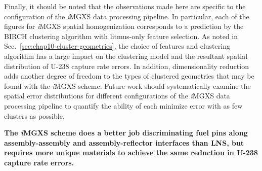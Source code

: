 Finally, it should be noted that the observations made here are specific to the configuration of the \textit{i}\ac{MGXS} data processing pipeline. In particular, each of the figures for \textit{i}\ac{MGXS} spatial homogenization corresponds to a prediction by the BIRCH clustering algorithm with litmus-only feature selection. As noted in Sec.~\ref{sec:chap10-cluster-geometries}, the choice of features and clustering algorithm has a large impact on the clustering model and the resultant spatial distribution of U-238 capture rate errors. In addition, dimensionality reduction adds another degree of freedom to the types of clustered geometries that may be found with the \textit{i}\ac{MGXS} scheme. Future work should systematically examine the spatial error distributions for different configurations of the \textit{i}\ac{MGXS} data processing pipeline to quantify the ability of each minimize error with as few clusters as possible.

\begin{emphbox}
\textbf{The \textit{i}\ac{MGXS} scheme does a better job discriminating fuel pins along assembly-assembly and assembly-reflector interfaces than \ac{LNS}, but requires more unique materials to achieve the same reduction in U-238 capture rate errors.}
\end{emphbox}


